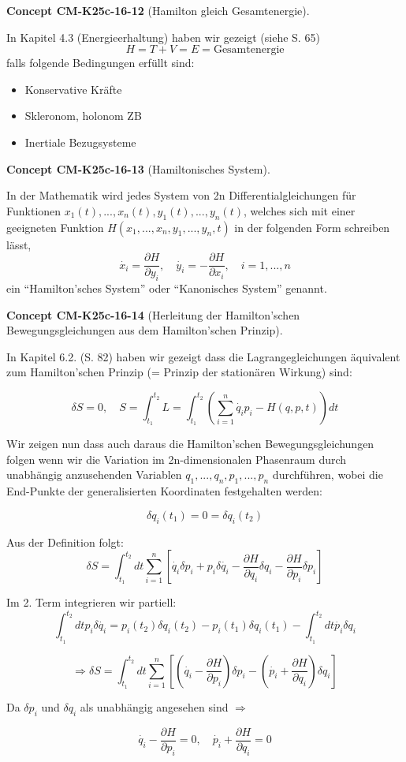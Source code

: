 \documentclass[10pt, letterpaper]{article}
\newcommand{\CustomHeading}[3]{%
  \par\medskip\noindent%
  \textbf{#1 #2} \textnormal{(#3)}.\enskip%
}
\newenvironment{CONC}[2]{\CustomHeading{Concept}{#1}{#2}}{}
\begin{document}
\begin{CONC}{CM-K25c-16-12}{Hamilton gleich Gesamtenergie}
In Kapitel 4.3 (Energieerhaltung) haben wir gezeigt (siehe S. 65)
\[H = T + V = E = \text{Gesamtenergie}\]
falls folgende Bedingungen erfüllt sind:
\begin{itemize}
\item Konservative Kräfte
\item Skleronom, holonom ZB
\item Inertiale Bezugsysteme
\end{itemize}
\end{CONC}

\begin{CONC}{CM-K25c-16-13}{Hamiltonisches System}
In der Mathematik wird jedes System von 2n Differentialgleichungen für Funktionen $x_1(t),...,x_n(t), y_1(t),...,y_n(t)$, welches sich mit einer geeigneten Funktion $H(x_1,...,x_n,y_1,...,y_n,t)$ in der folgenden Form schreiben lässt,
\[\dot{x_i} = \frac{\partial H}{\partial y_i}, \quad \dot{y_i} = -\frac{\partial H}{\partial x_i}, \quad i=1,...,n\]
ein ``Hamilton'sches System'' oder ``Kanonisches System'' genannt.
\end{CONC}

\begin{CONC}{CM-K25c-16-14}{Herleitung der Hamilton'schen Bewegungsgleichungen aus dem Hamilton'schen Prinzip}
In Kapitel 6.2. (S. 82) haben wir gezeigt dass die Lagrangegleichungen äquivalent zum Hamilton'schen Prinzip (= Prinzip der stationären Wirkung) sind:

\[\delta S = 0, \quad S = \int_{t_1}^{t_2} L = \int_{t_1}^{t_2} \left(\sum_{i=1}^n \dot{q_i}p_i - H(q,p,t)\right)dt\]

Wir zeigen nun dass auch daraus die Hamilton'schen Bewegungsgleichungen folgen wenn wir die Variation im 2n-dimensionalen Phasenraum durch unabhängig anzusehenden Variablen $q_1,...,q_n, p_1,...,p_n$ durchführen, wobei die End-Punkte der generalisierten Koordinaten festgehalten werden:

\[\delta q_i(t_1) = 0 = \delta q_i(t_2)\]

Aus der Definition folgt:
\[\delta S = \int_{t_1}^{t_2} dt \sum_{i=1}^n \left[\dot{q_i}\delta p_i + p_i\delta\dot{q_i} - \frac{\partial H}{\partial q_i}\delta q_i - \frac{\partial H}{\partial p_i}\delta p_i\right]\]

Im 2. Term integrieren wir partiell:
\[\int_{t_1}^{t_2} dt p_i\delta\dot{q_i} = p_i(t_2)\delta q_i(t_2) - p_i(t_1)\delta q_i(t_1) - \int_{t_1}^{t_2} dt\dot{p_i}\delta q_i\]

\[\Rightarrow \delta S = \int_{t_1}^{t_2} dt \sum_{i=1}^n \left[\left(\dot{q_i} - \frac{\partial H}{\partial p_i}\right)\delta p_i - \left(\dot{p_i} + \frac{\partial H}{\partial q_i}\right)\delta q_i\right]\]

Da $\delta p_i$ und $\delta q_i$ als unabhängig angesehen sind $\Rightarrow$

\[\dot{q_i} - \frac{\partial H}{\partial p_i} = 0, \quad \dot{p_i} + \frac{\partial H}{\partial q_i} = 0\]
\end{CONC}
\end{document}
